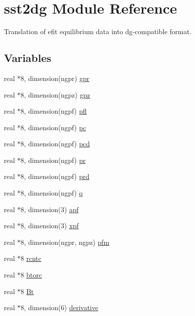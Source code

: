 \hypertarget{namespacesst2dg}{
\section{sst2dg Module Reference}
\label{namespacesst2dg}
}
Translation of efit equilibrium data into dg-compatible format.  


\subsection*{Variables}
\begin{CompactItemize}
\item 
real $\ast$8, dimension(ngpr) \hyperlink{namespacesst2dg_f791e86241018c9bb33cec0443b40af8}{gpr}
\item 
real $\ast$8, dimension(ngpz) \hyperlink{namespacesst2dg_82caba92133c4a04b34288af472f7062}{gpz}
\item 
real $\ast$8, dimension(ngpf) \hyperlink{namespacesst2dg_2203dfee9c8d2e237448b1db690841e8}{pfl}
\item 
real $\ast$8, dimension(ngpf) \hyperlink{namespacesst2dg_9f23908c8ac0e5d6fbb4ad52dc264f34}{pc}
\item 
real $\ast$8, dimension(ngpf) \hyperlink{namespacesst2dg_3faab1369647d235c6af4263bbb20b5f}{pcd}
\item 
real $\ast$8, dimension(ngpf) \hyperlink{namespacesst2dg_21c838c895717871a1ecda9aca97e18c}{pr}
\item 
real $\ast$8, dimension(ngpf) \hyperlink{namespacesst2dg_4dcd19f888989c1c8a8b00ae96550144}{prd}
\item 
real $\ast$8, dimension(ngpf) \hyperlink{namespacesst2dg_b6dac7ae161bf3684a33bfc278f4a627}{q}
\item 
real $\ast$8, dimension(3) \hyperlink{namespacesst2dg_3acca40cb9b97fe216f3f11dd3c7b4da}{apf}
\item 
real $\ast$8, dimension(3) \hyperlink{namespacesst2dg_29432778288d94db8d33519f10679b1f}{xpf}
\item 
real $\ast$8, dimension(ngpr, ngpz) \hyperlink{namespacesst2dg_15842cce2147922d148223aebbdd979b}{pfm}
\item 
real $\ast$8 \hyperlink{namespacesst2dg_87457152e8dd71203a0bfb7a6ee0ce7a}{rcntc}
\item 
real $\ast$8 \hyperlink{namespacesst2dg_9aff60cf58711338aef804123dca3cd5}{btorc}
\item 
real $\ast$8 \hyperlink{namespacesst2dg_8213ddbfdc0dce0dd4119c3c22c626ac}{Bt}
\item 
real $\ast$8, dimension(6) \hyperlink{namespacesst2dg_3ba2dea221af554e256dce59b5dbb988}{derivative}
\end{CompactItemize}


